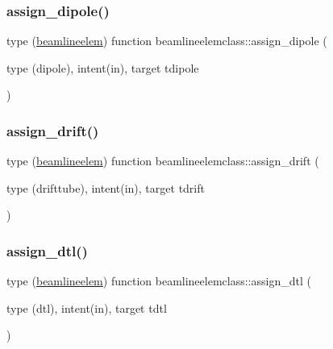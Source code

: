 \mbox{\label{namespacebeamlineelemclass_ab472ce183e8b1faa6f40c494a9d8bc03}} 
\subsubsection{\texorpdfstring{assign\_dipole()}{assign\_dipole()}}
{\footnotesize\ttfamily type (\mbox{\hyperlink{namespacebeamlineelemclass_structbeamlineelemclass_1_1beamlineelem}{beamlineelem}}) function beamlineelemclass\+::assign\+\_\+dipole (\begin{DoxyParamCaption}\item[{type (dipole), intent(in), target}]{tdipole }\end{DoxyParamCaption})}

\mbox{\label{namespacebeamlineelemclass_a667b68ced2d4a0e5cd691d7d472a59ae}} 
\subsubsection{\texorpdfstring{assign\_drift()}{assign\_drift()}}
{\footnotesize\ttfamily type (\mbox{\hyperlink{namespacebeamlineelemclass_structbeamlineelemclass_1_1beamlineelem}{beamlineelem}}) function beamlineelemclass\+::assign\+\_\+drift (\begin{DoxyParamCaption}\item[{type (drifttube), intent(in), target}]{tdrift }\end{DoxyParamCaption})}

\mbox{\label{namespacebeamlineelemclass_a56b55ab902212809615ff965f7e6591d}} 
\subsubsection{\texorpdfstring{assign\_dtl()}{assign\_dtl()}}
{\footnotesize\ttfamily type (\mbox{\hyperlink{namespacebeamlineelemclass_structbeamlineelemclass_1_1beamlineelem}{beamlineelem}}) function beamlineelemclass\+::assign\+\_\+dtl (\begin{DoxyParamCaption}\item[{type (dtl), intent(in), target}]{tdtl }\end{DoxyParamCaption})}

